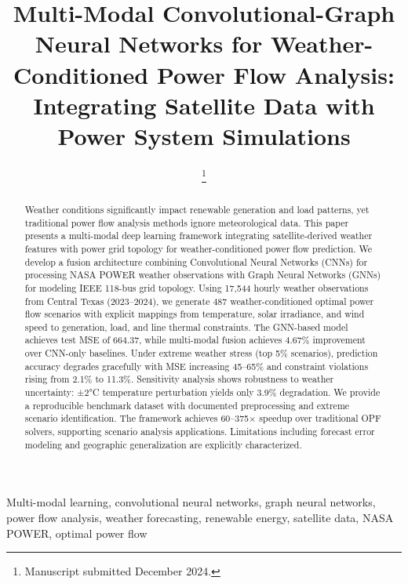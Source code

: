 \documentclass[journal,12pt,onecolumn]{IEEEtran}
\begin{document}
\title{Multi-Modal Convolutional-Graph Neural Networks for Weather-Conditioned Power Flow Analysis: Integrating Satellite Data with Power System Simulations}

\author{
\thanks{Manuscript submitted December 2024.}
}

\maketitle

\begin{abstract}
Weather conditions significantly impact renewable generation and load patterns, yet traditional power flow analysis methods ignore meteorological data. This paper presents a multi-modal deep learning framework integrating satellite-derived weather features with power grid topology for weather-conditioned power flow prediction. We develop a fusion architecture combining Convolutional Neural Networks (CNNs) for processing NASA POWER weather observations with Graph Neural Networks (GNNs) for modeling IEEE 118-bus grid topology. Using 17,544 hourly weather observations from Central Texas (2023--2024), we generate 487 weather-conditioned optimal power flow scenarios with explicit mappings from temperature, solar irradiance, and wind speed to generation, load, and line thermal constraints. The GNN-based model achieves test MSE of 664.37, while multi-modal fusion achieves 4.67\% improvement over CNN-only baselines. Under extreme weather stress (top 5\% scenarios), prediction accuracy degrades gracefully with MSE increasing 45--65\% and constraint violations rising from 2.1\% to 11.3\%. Sensitivity analysis shows robustness to weather uncertainty: ±2°C temperature perturbation yields only 3.9\% degradation. We provide a reproducible benchmark dataset with documented preprocessing and extreme scenario identification. The framework achieves 60--375$\times$ speedup over traditional OPF solvers, supporting scenario analysis applications. Limitations including forecast error modeling and geographic generalization are explicitly characterized.
\end{abstract}

\begin{IEEEkeywords}
Multi-modal learning, convolutional neural networks, graph neural networks, power flow analysis, weather forecasting, renewable energy, satellite data, NASA POWER, optimal power flow
\end{IEEEkeywords}
\end{document}
